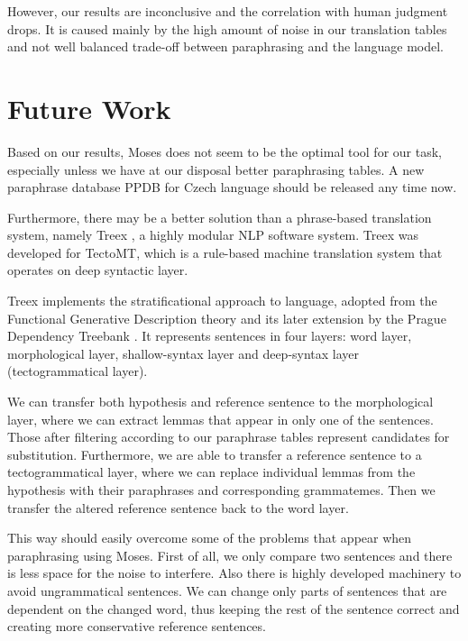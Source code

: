 However, our results are inconclusive and the correlation with human judgment
drops. It is caused mainly by the high amount of noise in our translation tables and
not well balanced trade-off between paraphrasing and the language model.


\section{Future Work}
Based on our results, Moses does not seem to be the optimal tool for our task, especially
unless we have at our disposal better paraphrasing tables. A new paraphrase database 
PPDB \cite{GANITKEVITCH14} for Czech language should be released any time now. 

Furthermore, there may be a better solution than a phrase-based translation
system, namely Treex \cite{treex}, a highly modular NLP software system. Treex
was developed for TectoMT, which is a rule-based machine translation system that
operates on deep syntactic layer.

Treex implements the stratificational approach to language, adopted from the 
Functional Generative Description theory \cite{FGP} and its later extension by the 
Prague Dependency Treebank \cite{PDT3.0}. It represents sentences in four layers:
word layer, morphological layer, shallow-syntax layer and deep-syntax layer 
(tectogrammatical layer).

We can transfer both hypothesis and reference sentence to the morphological layer, 
where we can extract lemmas that appear in only one of the sentences. Those after
filtering according to our paraphrase tables represent candidates for substitution.
Furthermore, we are able to transfer a reference sentence to a tectogrammatical 
layer, where we can replace individual lemmas from the hypothesis with their paraphrases 
and corresponding grammatemes. Then we transfer the altered reference sentence back to 
the word layer.

This way should easily overcome some of the problems that appear when paraphrasing using 
Moses. First of all, we only compare two sentences and there is less space for %
the noise to interfere. Also there is highly developed machinery to avoid ungrammatical 
sentences. We can change only parts of sentences that are dependent on the changed 
word, thus keeping the rest of the sentence correct and creating more conservative 
reference sentences.

